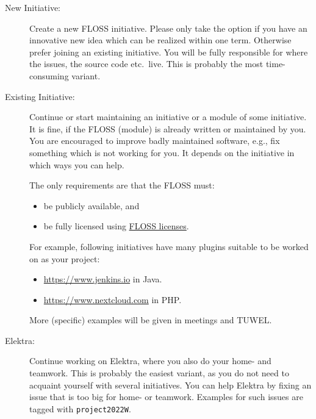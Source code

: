\documentclass[11pt,a4paper]{article}
\def\myterm{2022W}
\begin{document}
\begin{description}
\item[New Initiative:] Create a new FLOSS initiative.
	Please only take the option if you have an innovative new idea which can be realized within one term.
	Otherwise prefer joining an existing initiative.
	You will be fully responsible for where the issues, the source code etc.\ live.
	This is probably the most time-consuming variant.
\item[Existing Initiative:]
	Continue or start maintaining an initiative or a module of some initiative.
	It is fine, if the FLOSS (module) is already written or maintained by you.
	You are encouraged to improve badly maintained software, e.g., fix something which is not working for you.
	It depends on the initiative in which ways you can help.

	The only requirements are that the FLOSS must:
	\begin{itemize}
	\item be publicly available, and
	\item be fully licensed using \href{https://www.gnu.org/licenses/license-list}{FLOSS licenses}.
	\end{itemize}

	For example, following initiatives have many plugins suitable to be worked on as your project:
	\begin{itemize}
	\item \url{https://www.jenkins.io} in Java.
	\item \url{https://www.nextcloud.com} in PHP.
	\end{itemize}
	More (specific) examples will be given in meetings and TUWEL.
\item[Elektra:]
	Continue working on Elektra, where you also do your home- and teamwork.
	This is probably the easiest variant, as you do not need to acquaint yourself with several initiatives.
	You can help Elektra by fixing an issue that is too big for home- or teamwork.
	Examples for such issues are tagged with {\tt project\myterm}.
\end{description}

\newpage

\renewcommand{\thesection}{H0 Registration}
\end{document}
